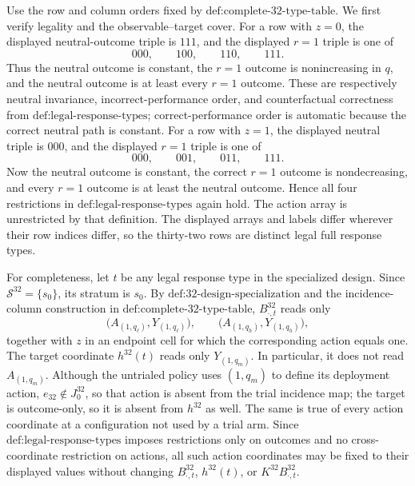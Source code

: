 Use the row and column orders fixed by \(\text{def:complete-32-type-table}\).  We first verify legality and the observable--target cover.  For a row with \(z=0\), the displayed neutral-outcome triple is \(111\), and the displayed \(r=1\) triple is one of
\[
000,\qquad 100,\qquad 110,\qquad 111.
\tag{19}
\]
Thus the neutral outcome is constant, the \(r=1\) outcome is nonincreasing in \(q\), and the neutral outcome is at least every \(r=1\) outcome.  These are respectively neutral invariance, incorrect-performance order, and counterfactual correctness from \(\text{def:legal-response-types}\); correct-performance order is automatic because the correct neutral path is constant.  For a row with \(z=1\), the displayed neutral triple is \(000\), and the displayed \(r=1\) triple is one of
\[
000,\qquad 001,\qquad 011,\qquad 111.
\tag{20}
\]
Now the neutral outcome is constant, the correct \(r=1\) outcome is nondecreasing, and every \(r=1\) outcome is at least the neutral outcome.  Hence all four restrictions in \(\text{def:legal-response-types}\) again hold.  The action array is unrestricted by that definition.  The displayed arrays and labels differ wherever their row indices differ, so the thirty-two rows are distinct legal full response types.

For completeness, let \(t\) be any legal response type in the specialized design.  Since \(\mathcal S^{32}=\{s_0\}\), its stratum is \(s_0\).  By \(\text{def:32-design-specialization}\) and the incidence-column construction in \(\text{def:complete-32-type-table}\), \(B^{32}_{\cdot,t}\) reads only
\[
\bigl(A_{(1,q_\ell)},Y_{(1,q_\ell)}\bigr),
\qquad
\bigl(A_{(1,q_h)},Y_{(1,q_h)}\bigr),
\tag{21}
\]
together with \(z\) in an endpoint cell for which the corresponding action equals one.  The target coordinate \(h^{32}(t)\) reads only \(Y_{(1,q_m)}\).  In particular, it does not read \(A_{(1,q_m)}\).  Although the untrialed policy uses \((1,q_m)\) to define its deployment action, \(e_{32}\notin J^{32}_0\), so that action is absent from the trial incidence map; the target is outcome-only, so it is absent from \(h^{32}\) as well.  The same is true of every action coordinate at a configuration not used by a trial arm.  Since \(\text{def:legal-response-types}\) imposes restrictions only on outcomes and no cross-coordinate restriction on actions, all such action coordinates may be fixed to their displayed values without changing \(B^{32}_{\cdot,t}\), \(h^{32}(t)\), or \(K^{32}B^{32}_{\cdot,t}\).

